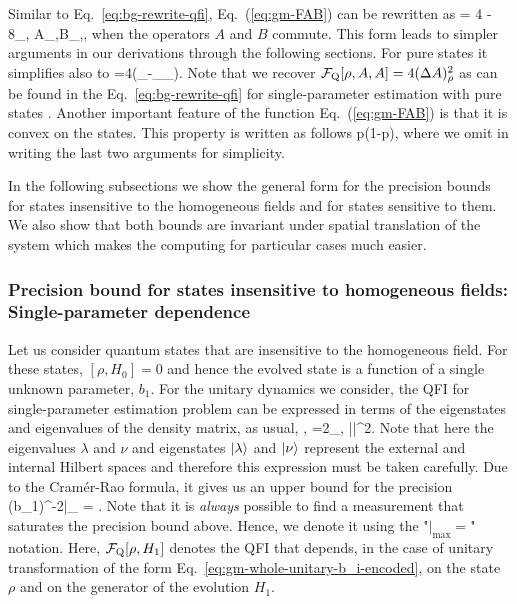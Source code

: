 Similar to Eq.~\eqref{eq:bg-rewrite-qfi}, Eq.~(\ref{eq:gm-FAB}) can be rewritten as
\be
  \label{eq:gm-QFI for two operators rewrited}
   = 4 
  - 8\sum_{\lambda,\nu} 
  {A}_{\lambda,\nu}{B}_{\nu,\lambda},
\ee
when the operators $A$ and $B$ commute.
This form leads to simpler arguments in our derivations through the following sections.
For pure states it simplifies also to
\be
  \label{eq:gm-QFI_pure}
  =4\left(_{\psi}-_{\psi}_{\psi}\right).
\ee
Note that we recover $\mathcal{F}_{\textnormal{Q}}[{\textstyle \rho,A,A}]=4(\Delta A)_\rho^2$ as can be found in the Eq.~\eqref{eq:bg-rewrite-qfi} for single-parameter estimation with pure states \cite{Paris2009,Toth2013}.
Another important feature of the function Eq.~(\ref{eq:gm-FAB}) is that it is convex on the states.
This property is written as follows
\be
  \leqslant
  p(1{-}p),
\ee
where we omit in writing the last two arguments for simplicity.

In the following subsections we show the general form for the precision bounds for states insensitive to the homogeneous fields and for states sensitive to them. We also show that both bounds are invariant under spatial translation of the system which makes the computing for particular cases much easier.

\subsubsection{Precision bound  for states insensitive to homogeneous fields:
Single-parameter dependence}

Let us consider quantum states that are  insensitive to the homogeneous field.
For these states, $[\rho, H_0]=0$ and hence the evolved state is a function of a single unknown parameter, $b_1$.
For the unitary dynamics we consider, the QFI for single-parameter estimation problem can be expressed in terms of the eigenstates and eigenvalues of the density matrix, as usual, \cite{Paris2009,Braunstein1994,Holevo1982,Helstrom1976,Petz2002,Petz2008},
\be
  \label{eq:gm-general one parameter quantum fisher information}
  =2\sum_{\lambda,\nu}  ||^2.
\ee
Note that here the eigenvalues $\lambda$ and $\nu$ and eigenstates $\vert{\lambda}\rangle$ and $\vert{\nu}\rangle$ represent the external and internal Hilbert spaces and therefore this expression must be taken carefully.
Due to the Cram\'er-Rao formula, it gives us an upper
bound for the precision
\be
  \label{eq:gm-one parameter precision bound}
  (\Delta b_1)^{-2}|_{\max} = .
\ee
Note that it is \emph{always} possible to find a measurement that saturates the precision bound above.
Hence, we denote it using the "$|_{\max} = $" notation.
Here, $\mathcal{F}_{\textnormal{Q}}[{\textstyle \rho,H_1}]$ denotes the QFI that depends, in the case of unitary transformation of the form Eq.~\eqref{eq:gm-whole-unitary-b_i-encoded}, on the state $\rho$ and on the generator of the evolution $H_1$.

